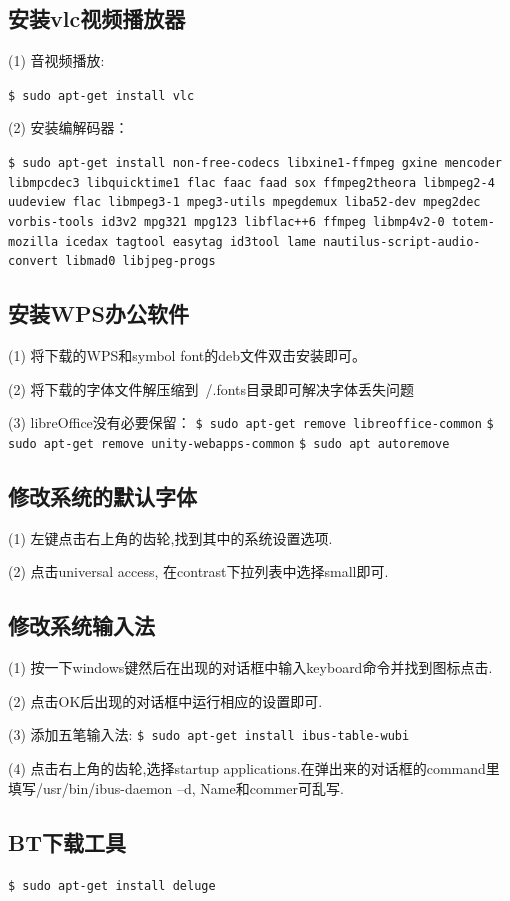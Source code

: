 \subsection{安装vlc视频播放器}
(1) 音视频播放:

\verb"$ sudo apt-get install vlc"

(2) 安装编解码器：

\verb"$ sudo apt-get install non-free-codecs libxine1-ffmpeg gxine mencoder libmpcdec3 libquicktime1 flac faac faad sox ffmpeg2theora libmpeg2-4 uudeview flac libmpeg3-1 mpeg3-utils mpegdemux liba52-dev mpeg2dec vorbis-tools id3v2 mpg321 mpg123 libflac++6 ffmpeg libmp4v2-0 totem-mozilla icedax tagtool easytag id3tool lame nautilus-script-audio-convert libmad0 libjpeg-progs"

\subsection{安装WPS办公软件}
(1) 将下载的WPS和symbol font的deb文件双击安装即可。

(2) 将下载的字体文件解压缩到~/.fonts目录即可解决字体丢失问题

(3) libreOffice没有必要保留：
\verb"$ sudo apt-get remove libreoffice-common"
\verb"$ sudo apt-get remove unity-webapps-common"
\verb"$ sudo apt autoremove"

\subsection{修改系统的默认字体}
(1) 左键点击右上角的齿轮,找到其中的系统设置选项.

(2) 点击universal access, 在contrast下拉列表中选择small即可.

\subsection{修改系统输入法}
(1) 按一下windows键然后在出现的对话框中输入keyboard命令并找到图标点击.

(2) 点击OK后出现的对话框中运行相应的设置即可.

(3) 添加五笔输入法:
\verb"$ sudo apt-get install ibus-table-wubi"

(4) 点击右上角的齿轮,选择startup applications.在弹出来的对话框的command里填写/usr/bin/ibus-daemon –d, Name和commer可乱写.

\subsection{BT下载工具}
\verb"$ sudo apt-get install deluge"

